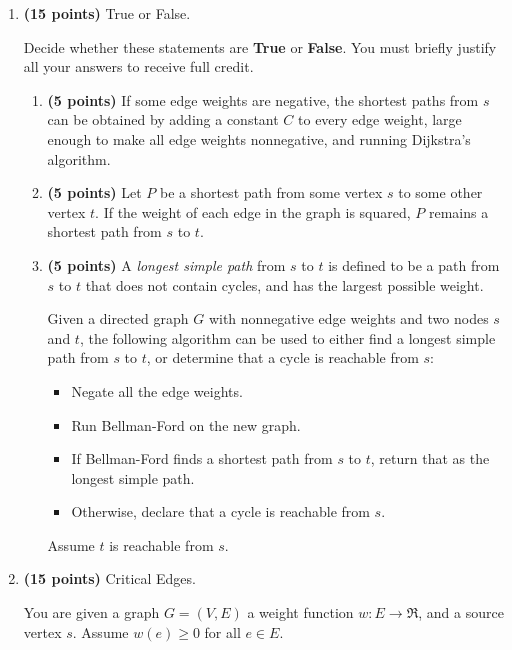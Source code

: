 \documentclass[12pt,twoside]{article}
\begin{document}
\begin{enumerate}


\item {\bf (15 points)} True or False.

  Decide whether these statements are {\bf True} or {\bf False}. You
  must briefly justify all your answers to receive full credit.

  \begin{enumerate}

  \item {\bf (5 points)} If some edge weights are negative, the
    shortest paths from $s$ can be obtained by adding a constant $C$
    to every edge weight, large enough to make all edge weights
    nonnegative, and running Dijkstra's algorithm.

  \item {\bf (5 points)} Let $P$ be a shortest path from some vertex
    $s$ to some other vertex $t$.  If the weight of each edge in the
    graph is squared, $P$ remains a shortest path from $s$ to $t$.

\newpage
  \item {\bf (5 points)} A \emph{longest simple path} from $s$ to $t$
    is defined to be a path from $s$ to $t$ that does not contain
    cycles, and has the largest possible weight.

    Given a directed graph $G$ with nonnegative edge weights and two
    nodes $s$ and $t$, the following algorithm can be used to either
    find a longest simple path from $s$ to $t$, or determine that a
    cycle is reachable from $s$:
    \begin{itemize}
    \item Negate all the edge weights.
    \item Run Bellman-Ford on the new graph.
    \item If Bellman-Ford finds a shortest path from $s$ to $t$,
    return that as the longest simple path.
    \item Otherwise, declare that a cycle is reachable from $s$.
    \end{itemize}

    Assume $t$ is reachable from $s$. 

  \end{enumerate}


\item {\bf (15 points)} Critical Edges.

  You are given a graph $G=(V,E)$ a weight function $w:E \rightarrow
  \Re$, and a source vertex $s$. Assume $w(e) \geq 0$ for all $e \in
  E$.  


\end{enumerate}
\end{document}

